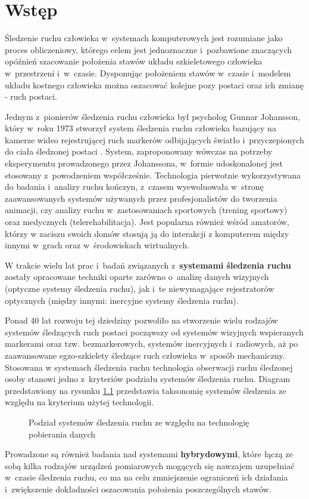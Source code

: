 
\chapter{Wstęp}\label{chap:intro}
Śledzenie ruchu człowieka w~systemach komputerowych jest rozumiane jako proces obliczeniowy, którego celem jest jednoznaczne i~pozbawione znaczących opóźnień szacowanie położenia stawów układu szkieletowego człowieka w~przestrzeni i~w~czasie. Dysponując położeniem stawów w~czasie i~modelem układu kostnego człowieka można oszacować kolejne pozy postaci oraz ich zmianę - ruch postaci.

Jednym z~pionierów śledzenia ruchu człowieka był psycholog Gunnar Johansson, który w~roku 1973 stworzył system śledzenia ruchu człowieka bazujący na kamerze wideo rejestrującej ruch markerów odbijających światło i~przyczepionych do ciała śledzonej postaci \cite{Johansson1973}. System, zaproponowany wówczas na potrzeby eksperymentu prowadzonego przez Johanssona, w~formie udoskonalonej jest stosowany z~powodzeniem współcześnie. Technologia pierwotnie wykorzystywana do badania i~analizy ruchu kończyn, z~czasem wyewoluowała w~stronę zaawansowanych systemów używanych przez profesjonalistów do tworzenia animacji, czy analizy ruchu w~zastosowaniach sportowych (trening sportowy) oraz medycznych (telerehabilitacja). Jest popularna również wśród amatorów, którzy w zaciszu swoich domów stosują ją do interakcji z komputerem między innymi w~grach oraz w~środowiskach wirtualnych.

W trakcie wielu lat prac i~badań związanych z~\textbf{systemami śledzenia ruchu} zostały opracowane techniki oparte zarówno o~analizę danych wizyjnych (optyczne systemy śledzenia ruchu), jak i~te niewymagające rejestratorów optycznych (między innymi: inercyjne systemy śledzenia ruchu).

Ponad 40 lat rozwoju tej dziedziny pozwoliło na stworzenie wielu rodzajów systemów śledzących ruch postaci począwszy od systemów wizyjnych wspieranych markerami oraz tzw. bezmarkerowych, systemów inercyjnych i~radiowych, aż po zaawansowane egzo-szkielety śledzące ruch człowieka w~sposób mechaniczny. Stosowana w systemach śledzenia ruchu technologia obserwacji ruchu śledzonej osoby stanowi jedno z~kryteriów podziału systemów śledzenia ruchu. Diagram przedstawiony na rysunku \ref{fig:literature:mocapSystems:diagram} przedstawia taksonomię systemów śledzenia ze względu na kryterium użytej technologii.

\begin{savenotes}
	\begin{figure}[h]
		\centering

	\caption{Podział systemów śledzenia ruchu ze względu na technologię pobierania danych}
		\label{fig:literature:mocapSystems:diagram}
	\end{figure}
\end{savenotes}
Prowadzone są również badania nad systemami \textbf{hybrydowymi}, które łączą ze sobą kilka rodzajów urządzeń pomiarowych mogących się nawzajem uzupełniać w~czasie śledzenia ruchu, co ma na celu zmniejszenie ograniczeń ich działania i~zwiększenie dokładności oszacowania położenia poszczególnych stawów.


